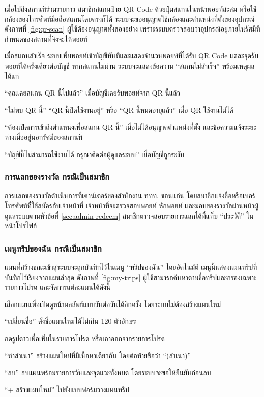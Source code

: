 เมื่อไปถึงสถานที่ร่วมรายการ สมาชิกสแกนป้าย QR Code ด้วยปุ่มสแกนในหน้าพอยท์สะสม หรือใช้กล้องของโทรศัพท์มือถือสแกนโดยตรงก็ได้ ระบบจะขออนุญาตใช้กล้องและตำแหน่งที่ตั้งของอุปกรณ์ ดังภาพที่ \ref{fig:qr-scan} ผู้ใช้ต้องอนุญาตทั้งสองอย่าง เพราะระบบตรวจสอบว่าอุปกรณ์อยู่ภายในรัศมีที่กำหนดของสถานที่จึงจะให้พอยท์


เมื่อสแกนสำเร็จ ระบบเพิ่มพอยท์เข้าบัญชีทันทีและแสดงจำนวนพอยท์ที่ได้รับ QR Code แต่ละจุดรับพอยท์ได้ครั้งเดียวต่อบัญชี หากสแกนไม่ผ่าน ระบบจะแสดงข้อความ ``สแกนไม่สำเร็จ'' พร้อมเหตุผล ได้แก่

\begin{numlist}
\item ``คุณเคยสแกน QR นี้ไปแล้ว'' เมื่อบัญชีเคยรับพอยท์จาก QR นี้แล้ว
\item ``ไม่พบ QR นี้'' ``QR นี้ปิดใช้งานอยู่'' หรือ ``QR นี้หมดอายุแล้ว'' เมื่อ QR ใช้งานไม่ได้
\item ``ต้องเปิดการเข้าถึงตำแหน่งเพื่อสแกน QR นี้'' เมื่อไม่ได้อนุญาตตำแหน่งที่ตั้ง และข้อความแจ้งระยะห่างเมื่ออยู่นอกรัศมีของสถานที่
\item ``บัญชีนี้ไม่สามารถใช้งานได้ กรุณาติดต่อผู้ดูแลระบบ'' เมื่อบัญชีถูกระงับ
\end{numlist}

\subsubsection{การแลกของรางวัล กรณีเป็นสมาชิก}

การแลกของรางวัลดำเนินการที่เคาน์เตอร์ของสำนักงาน ททท. ขอนแก่น โดยสมาชิกแจ้งชื่อหรือเบอร์โทรศัพท์ที่ใช้สมัครกับเจ้าหน้าที่ เจ้าหน้าที่จะตรวจสอบพอยท์ หักพอยท์ และมอบของรางวัลผ่านหน้าผู้ดูแลระบบตามหัวข้อที่ \ref{sec:admin-redeem} สมาชิกตรวจสอบรายการแลกได้ที่แท็บ ``ประวัติ'' ในหน้าโปรไฟล์

\subsubsection{เมนูทริปของฉัน กรณีเป็นสมาชิก}

แผนที่สร้างขณะเข้าสู่ระบบจะถูกบันทึกไว้ในเมนู ``ทริปของฉัน'' โดยอัตโนมัติ เมนูนี้แสดงแผนทริปที่บันทึกไว้เรียงจากแผนล่าสุด ดังภาพที่ \ref{fig:my-trips} ผู้ใช้สามารถค้นหาตามชื่อทริปและกรองเฉพาะรายการโปรด และจัดการแต่ละแผนได้ดังนี้


\begin{numlist}
\item เลือกแผนเพื่อเปิดดูหน้าผลลัพธ์แบบวันต่อวันได้อีกครั้ง โดยระบบไม่ต้องสร้างแผนใหม่
\item ``เปลี่ยนชื่อ'' ตั้งชื่อแผนใหม่ได้ไม่เกิน 120 ตัวอักษร
\item กดรูปดาวเพื่อเพิ่มในรายการโปรด หรือเอาออกจากรายการโปรด
\item ``ทำสำเนา'' สร้างแผนใหม่ที่มีเนื้อหาเดียวกัน โดยต่อท้ายชื่อว่า ``(สำเนา)''
\item ``ลบ'' ลบแผนพร้อมรายการวันและจุดแวะทั้งหมด โดยระบบจะขอให้ยืนยันก่อนลบ
\item ``+ สร้างแผนใหม่'' ไปยังแบบฟอร์มวางแผนทริป
\end{numlist}


